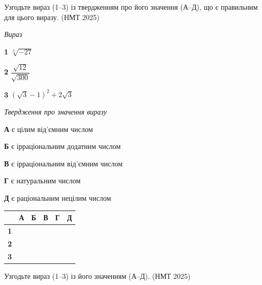 \documentclass[14pt]{extarticle}
\newcommand{\matchTable}{
\begin{tabular}{|>{\centering\arraybackslash}p{0.3cm}|*{5}{>{\centering\arraybackslash}p{0.3cm}|}}
\hline
& \textbf{А} & \textbf{Б} & \textbf{В} & \textbf{Г} & \textbf{Д} \\
\hline
\textbf{1} & \rule{0pt}{0.3cm} & & & & \\
\hline
\textbf{2} & \rule{0pt}{0.3cm} & & & & \\
\hline
\textbf{3} & \rule{0pt}{0.3cm} & & & & \\
\hline
\end{tabular}
}
\newcommand{\task}[2]{\noindent\makebox[1.5em][l]{\textbf{#1.}}\parbox[t]{\dimexpr\textwidth-1.5em}{#2}}
\newcommand{\nmtyear}[1]{\hfill{\small\color{yearcolor}(НМТ #1)}}
\begin{document}
\vspace{0.5cm}

\task{39}{Узгодьте вираз (1--3) із твердженням про його значення (А--Д), що є правильним для цього виразу. \nmtyear{2025}}

\vspace{0.3cm}
\begin{minipage}{0.35\textwidth}
\textit{Вираз}

\vspace{0.2cm}
\textbf{1} \quad $\sqrt[3]{-27}$

\vspace{0.3cm}
\textbf{2} \quad $\dfrac{\sqrt{12}}{\sqrt{300}}$

\vspace{0.2cm}
\textbf{3} \quad $(\sqrt{3} - 1)^2 + 2\sqrt{3}$
\end{minipage}
\hfill
\begin{minipage}{0.45\textwidth}
\textit{Твердження про значення виразу}

\vspace{0.2cm}
\textbf{А} \quad є цілим від'ємним числом

\vspace{0.2cm}
\textbf{Б} \quad є ірраціональним додатним числом

\vspace{0.2cm}
\textbf{В} \quad є ірраціональним від'ємним числом

\vspace{0.2cm}
\textbf{Г} \quad є натуральним числом

\vspace{0.2cm}
\textbf{Д} \quad є раціональним нецілим числом
\end{minipage}
\hfill
\begin{minipage}{0.15\textwidth}
\matchTable
\end{minipage}

\vspace{0.7cm}

\task{40}{Узгодьте вираз (1--3) із його значенням (А--Д). \nmtyear{2025}}
\end{document}
